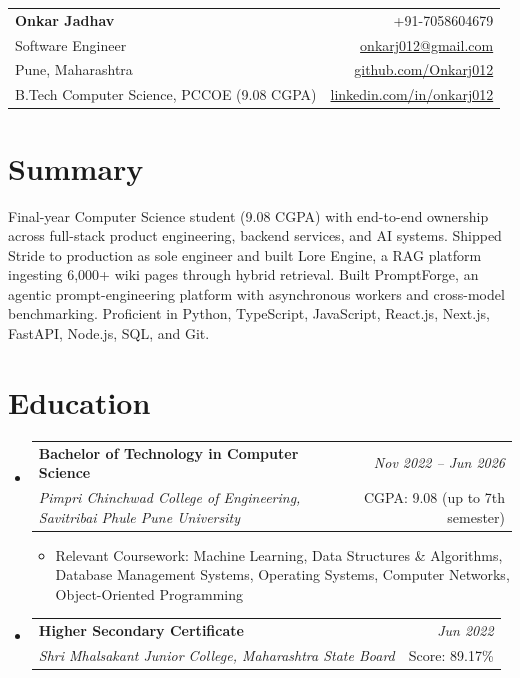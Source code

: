 \documentclass[a4paper,11pt]{article}
\makeatletter
\newcommand{\resumeSubheading}[4]{
\vspace{0.5mm}\item
    \begin{tabular*}{0.98\textwidth}[t]{l@{\extracolsep{\fill}}r}
        \textbf{#1} & \textit{\footnotesize{#4}} \\
        \textit{\footnotesize{#3}} & \footnotesize{#2}\\
    \end{tabular*}
    \vspace{-2.4mm}
}
\newcommand{\resumeSubHeadingListStart}{\begin{itemize}[leftmargin=*,labelsep=0mm]}
\newcommand{\resumeItemListStart}{\begin{justify}\begin{itemize}[leftmargin=3ex, rightmargin=2ex, noitemsep,labelsep=1.2mm,itemsep=0mm]\small}
\newcommand{\resumeSubHeadingListEnd}{\end{itemize}\vspace{2mm}}
\newcommand{\resumeItemListEnd}{\end{itemize}\end{justify}\vspace{-2mm}}
\newcommand{\name}{Onkar Jadhav}
\newcommand{\phone}{7058604679}
\newcommand{\emaila}{onkarj012@gmail.com}
\newcommand{\github}{github.com/Onkarj012}
\newcommand{\linkedin}{linkedin.com/in/onkarj012}
\makeatother
\begin{document}
\selectfont

\begin{tabularx}{\linewidth}{L r}
  \textbf{\Large \name} & {+91-\phone}\\
  {Software Engineer} & \href{mailto:\emaila}{\emaila} \\
  {Pune, Maharashtra} & \href{https://\github}{\github} \\
  {B.Tech Computer Science, PCCOE (9.08 CGPA)} & \href{https://\linkedin}{\linkedin}
\end{tabularx}
\vspace{-4mm}

\section{\textbf{Summary}}
\vspace{1mm}
\small{
Final-year Computer Science student (9.08 CGPA) with end-to-end ownership across full-stack product engineering, backend services, and AI systems. Shipped Stride to production as sole engineer and built Lore Engine, a RAG platform ingesting 6,000+ wiki pages through hybrid retrieval. Built PromptForge, an agentic prompt-engineering platform with asynchronous workers and cross-model benchmarking. Proficient in Python, TypeScript, JavaScript, React.js, Next.js, FastAPI, Node.js, SQL, and Git.
}
\vspace{-3mm}

\section{\textbf{Education}}
  \resumeSubHeadingListStart
    \resumeSubheading
      {Bachelor of Technology in Computer Science}{CGPA: 9.08 (up to 7th semester)}
      {Pimpri Chinchwad College of Engineering, Savitribai Phule Pune University}{Nov 2022 -- Jun 2026}
      \resumeItemListStart
        \item {Relevant Coursework: Machine Learning, Data Structures \& Algorithms, Database Management Systems, Operating Systems, Computer Networks, Object-Oriented Programming}
      \resumeItemListEnd
    \resumeSubheading
      {Higher Secondary Certificate}{Score: 89.17\%}
      {Shri Mhalsakant Junior College, Maharashtra State Board}{Jun 2022}
  \resumeSubHeadingListEnd
\vspace{-5.5mm}

\end{document}
